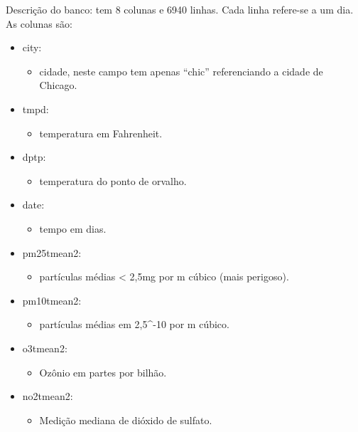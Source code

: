 \documentclass[]{book}
\providecommand{\tightlist}{%
  \setlength{\itemsep}{0pt}\setlength{\parskip}{0pt}}
\begin{document}
Descrição do banco: tem 8 colunas e 6940 linhas. Cada linha refere-se a um dia. As colunas são:

\begin{itemize}
\tightlist
\item
  city:

  \begin{itemize}
  \tightlist
  \item
    cidade, neste campo tem apenas ``chic'' referenciando a cidade de Chicago.
  \end{itemize}
\item
  tmpd:

  \begin{itemize}
  \tightlist
  \item
    temperatura em Fahrenheit.
  \end{itemize}
\item
  dptp:

  \begin{itemize}
  \tightlist
  \item
    temperatura do ponto de orvalho.
  \end{itemize}
\item
  date:

  \begin{itemize}
  \tightlist
  \item
    tempo em dias.
  \end{itemize}
\item
  pm25tmean2:

  \begin{itemize}
  \tightlist
  \item
    partículas médias \textless{} 2,5mg por m cúbico (mais perigoso).
  \end{itemize}
\item
  pm10tmean2:

  \begin{itemize}
  \tightlist
  \item
    partículas médias em 2,5\^{}-10 por m cúbico.
  \end{itemize}
\item
  o3tmean2:

  \begin{itemize}
  \tightlist
  \item
    Ozônio em partes por bilhão.
  \end{itemize}
\item
  no2tmean2:

  \begin{itemize}
  \tightlist
  \item
    Medição mediana de dióxido de sulfato.
  \end{itemize}
\end{itemize}
\end{document}
